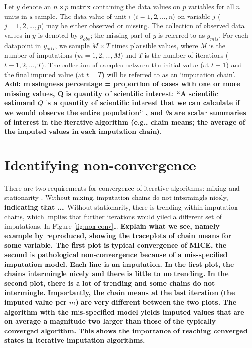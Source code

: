 \documentclass[Royal,times,sageh]{sagej}
\begin{document}
Let \(y\) denote an \(n \times p\) matrix containing the data values on
\(p\) variables for all \(n\) units in a sample. The data value of unit
\(i\) (\(i = 1, 2, \dots, n\)) on variable \(j\)
(\(j = 1, 2, \dots, p\)) may be either observed or missing. The
collection of observed data values in \(y\) is denoted by \(y_{obs}\);
the missing part of \(y\) is referred to as \(y_{mis}\). For each
datapoint in \(y_{mis}\), we sample \(M \times T\) times plausible
values, where \(M\) is the number of imputations
(\(m = 1, 2, \dots, M\)) and \(T\) is the number of iterations
(\(t = 1, 2, \dots, T\)). The collection of samples between the initial
value (at \(t=1\)) and the final imputed value (at \(t=T\)) will be
referred to as an `imputation chain'. \textbf{Add: missingness
percentage = proportion of cases with one or more missing values, Q is
quantity of scientific interest: ``A scientific estimand \(Q\) is a
quantity of scientific interest that we can calculate if we would
observe the entire population'' \citep[par 2.3.1]{buur18}, and
\(\theta\)s are scalar summaries of interest in the iterative algorithm
(e.g., chain means; the average of the imputed values in each imputation
chain). }

\hypertarget{identifying-non-convergence}{%
\section{Identifying
non-convergence}\label{identifying-non-convergence}}

There are two requirements for convergence of iterative algorithms:
mixing and stationarity \citep{gelm13}. Without mixing, imputation
chains do not intermingle nicely, \textbf{indicating that \ldots{}}.
Without stationarity, there is trending within imputation chains, which
implies that further iterations would yiled a different set of
imputations. In Figure \ref{fig:non-conv}\ldots{} \textbf{Explain what
we see, namely example by \citet{buur18} reproduced, showing the
traceplots of chain means for some variable. The first plot is typical
convergence of MICE, the second is pathological non-convergence because
of a mis-specified imputation model. Each line is an imputation. In the
first plot, the chains intermingle nicely and there is little to no
trending. In the second plot, there is a lot of trending and some chains
do not intermingle. Importantly, the chain means at the last iteration
(the imputed value per \(m\)) are very different between the two plots.
The algorithm with the mis-specified model yields imputed values that
are on average a magnitude two larger than those of the typically
converged algorithm. This shows the importance of reaching converged
states in iterative imputation algorithms.}
\end{document}
